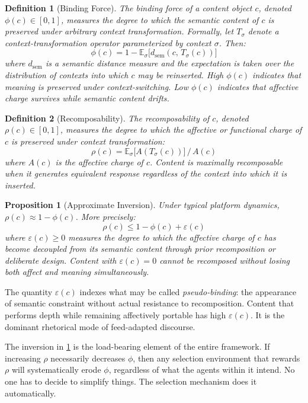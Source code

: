\documentclass[12pt]{article}
\newtheorem{proposition}{Proposition}[section]
\newtheorem{definition}{Definition}[section]
\newcommand{\bind}{\phi}
\newcommand{\recomp}{\rho}
\newcommand{\dsem}{d_{\mathrm{sem}}}
\begin{document}
\begin{definition}[Binding Force]
\label{def:binding}
The binding force of a content object $c$, denoted $\bind(c) \in [0,1]$,
measures the degree to which the semantic content of $c$ is preserved
under arbitrary context transformation. Formally, let $T_\sigma$ denote a
context-transformation operator parameterized by context $\sigma$. Then:
\[
\bind(c) = 1 - \mathbb{E}_\sigma\bigl[\dsem(c,\, T_\sigma(c))\bigr]
\]
where $\dsem$ is a semantic distance measure and the expectation is taken
over the distribution of contexts into which $c$ may be reinserted.
High $\bind(c)$ indicates that meaning is preserved under
context-switching. Low $\bind(c)$ indicates that affective charge
survives while semantic content drifts.
\end{definition}

\begin{definition}[Recomposability]
\label{def:recomp}
The recomposability of $c$, denoted $\recomp(c) \in [0,1]$, measures the
degree to which the affective or functional charge of $c$ is preserved
under context transformation:
\[
\recomp(c) = \mathbb{E}_\sigma\bigl[A(T_\sigma(c))\bigr] \,/\, A(c)
\]
where $A(c)$ is the affective charge of $c$. Content is maximally
recomposable when it generates equivalent response regardless of the
context into which it is inserted.
\end{definition}

\begin{proposition}[Approximate Inversion]
\label{prop:inversion}
Under typical platform dynamics, $\recomp(c) \approx 1 - \bind(c)$.
More precisely:
\[
\recomp(c) \leq 1 - \bind(c) + \varepsilon(c)
\]
where $\varepsilon(c) \geq 0$ measures the degree to which the affective
charge of $c$ has become decoupled from its semantic content through
prior recomposition or deliberate design. Content with $\varepsilon(c)
= 0$ cannot be recomposed without losing both affect and meaning
simultaneously.
\end{proposition}

The quantity $\varepsilon(c)$ indexes what may be called
\emph{pseudo-binding}: the appearance of semantic constraint without
actual resistance to recomposition. Content that performs depth while
remaining affectively portable has high $\varepsilon(c)$. It is the
dominant rhetorical mode of feed-adapted discourse.

The inversion in \cref{prop:inversion} is the load-bearing element of
the entire framework. If increasing $\recomp$ necessarily decreases
$\bind$, then any selection environment that rewards $\recomp$ will
systematically erode $\bind$, regardless of what the agents within it
intend. No one has to decide to simplify things. The selection mechanism
does it automatically.
\end{document}

